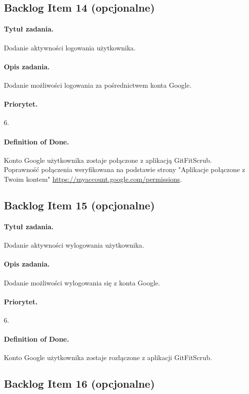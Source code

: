 \documentclass[a4paper]{article}
\begin{document}
\subsection{Backlog Item 14 (opcjonalne)}
\paragraph{Tytuł zadania.} Dodanie aktywności logowania użytkownika.
\paragraph{Opis zadania.} Dodanie możliwości logowania za pośrednictwem konta Google.
\paragraph{Priorytet.} 6.
\paragraph{Definition of Done.} Konto Google użytkownika zostaje połączone z aplikacją GitFitScrub. Poprawność połączenia weryfikowana na podstawie strony "Aplikacje połączone z Twoim kontem" \url{https://myaccount.google.com/permissions}.

\subsection{Backlog Item 15 (opcjonalne)}
\paragraph{Tytuł zadania.} Dodanie aktywności wylogowania użytkownika.
\paragraph{Opis zadania.} Dodanie możliwości wylogowania się z konta Google.
\paragraph{Priorytet.} 6.
\paragraph{Definition of Done.} Konto Google użytkownika zostaje rozłączone z aplikacji GitFitScrub.

\subsection{Backlog Item 16 (opcjonalne)}
\end{document}
